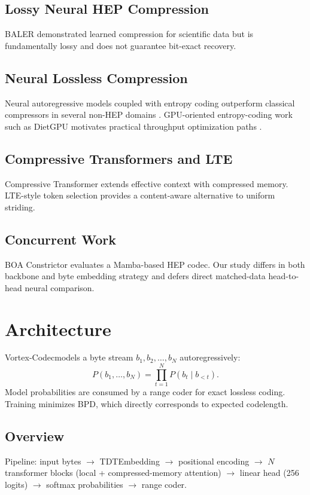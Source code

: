 \documentclass[10pt,twocolumn]{article}
\newcommand{\codec}{Vortex-Codec}
\begin{document}
\subsection{Lossy Neural HEP Compression}
BALER \cite{baler} demonstrated learned compression for scientific data but is fundamentally lossy and does not guarantee bit-exact recovery.

\subsection{Neural Lossless Compression}
Neural autoregressive models coupled with entropy coding outperform classical compressors in several non-HEP domains \cite{nncp,gopher_scaling}. GPU-oriented entropy-coding work such as DietGPU motivates practical throughput optimization paths \cite{dietgpu}.

\subsection{Compressive Transformers and LTE}
Compressive Transformer \cite{compressive_transformer} extends effective context with compressed memory. LTE-style token selection \cite{infini_lte} provides a content-aware alternative to uniform striding.

\subsection{Concurrent Work}
BOA Constrictor \cite{boa_constrictor} evaluates a Mamba-based HEP codec. Our study differs in both backbone and byte embedding strategy and defers direct matched-data head-to-head neural comparison.

\section{Architecture}
\codec models a byte stream $b_1, b_2, \ldots, b_N$ autoregressively:
\begin{equation}
P(b_1,\ldots,b_N)=\prod_{t=1}^{N}P(b_t\mid b_{<t}).
\end{equation}
Model probabilities are consumed by a range coder for exact lossless coding. Training minimizes BPD, which directly corresponds to expected codelength.

\subsection{Overview}
Pipeline: input bytes $\rightarrow$ TDTEmbedding $\rightarrow$ positional encoding $\rightarrow$ $N$ transformer blocks (local + compressed-memory attention) $\rightarrow$ linear head (256 logits) $\rightarrow$ softmax probabilities $\rightarrow$ range coder.
\end{document}
